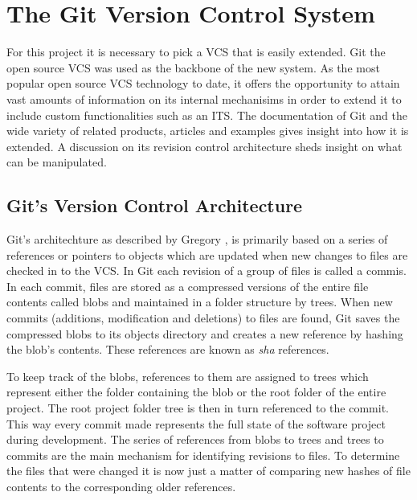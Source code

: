 \documentclass{mproj}
\begin{document}
\section{The Git Version Control System}

For this project it is necessary to pick a VCS that is easily extended. Git the open source VCS was used as the backbone of the new system. As the most popular open source VCS  technology to date, it offers the opportunity to attain vast amounts of information on its internal mechanisims in order to extend it to include custom functionalities such as an ITS. The documentation of Git and the wide variety of related products, articles and examples gives insight into how it is extended. A discussion on its revision control architecture sheds insight on what can be manipulated.



\subsection{Git's Version Control Architecture}

Git's architechture as described by Gregory \cite{BehindGit},  is primarily based on a series of references or pointers to objects which are updated when new changes to files are checked in to the VCS. In Git each revision of a group of files is called a commis. In each commit, files are stored as a compressed versions of the entire file contents called blobs and maintained in a folder structure by trees. When new commits (additions, modification and deletions) to files are found, Git saves the compressed blobs to its objects directory and creates a new reference by hashing the blob's contents. These references are known as \textit{sha} references. 

To keep track of the blobs, references to them are assigned to trees which represent either the folder containing the blob or the root folder of the entire project.  The root project folder tree is then in turn referenced to the commit. This way every commit made represents the full state of the software project during development. The series of references from blobs to trees and trees to commits are the main mechanism for identifying revisions to files. To determine the files that were changed it is now just a matter of comparing new hashes of file contents to the corresponding older references.
\end{document}
